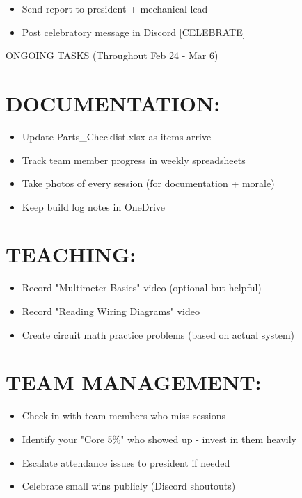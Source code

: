 \documentclass[11pt,letterpaper]{article}
\begin{document}
\begin{itemize}
  \item [CRITICAL] [ ] Send report to president + mechanical lead
  \item [CRITICAL] [ ] Post celebratory message in Discord [CELEBRATE]
\end{itemize}

ONGOING TASKS (Throughout Feb 24 - Mar 6)\par

\section{DOCUMENTATION:}

\begin{itemize}
  \item  [ ] Update Parts\_Checklist.xlsx as items arrive
  \item  [ ] Track team member progress in weekly spreadsheets
  \item  [ ] Take photos of every session (for documentation + morale)
  \item  [ ] Keep build log notes in OneDrive
\end{itemize}

\section{TEACHING:}

\begin{itemize}
  \item  [ ] Record "Multimeter Basics" video (optional but helpful)
  \item  [ ] Record "Reading Wiring Diagrams" video
  \item  [ ] Create circuit math practice problems (based on actual system)
\end{itemize}

\section{TEAM MANAGEMENT:}

\begin{itemize}
  \item  [ ] Check in with team members who miss sessions
  \item  [ ] Identify your "Core 5\%" who showed up - invest in them heavily
  \item  [ ] Escalate attendance issues to president if needed
  \item  [ ] Celebrate small wins publicly (Discord shoutouts)
\end{itemize}
\end{document}
